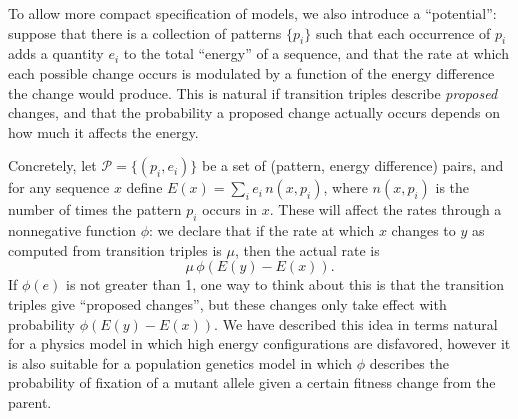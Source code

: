 \documentclass{article}
\newcommand{\calP}{\mathcal{P}}  %
\theoremstyle{plain}
\theoremstyle{definition}
\begin{document}
To allow more compact specification of models,
we also introduce a ``potential'':
suppose that there is a collection of patterns $\{p_i\}$
such that each occurrence of $p_i$ adds a quantity $e_i$ to the total ``energy'' of a sequence,
and that the rate at which each possible change occurs is modulated by a function of the energy difference the change would produce.
This is natural if transition triples describe \emph{proposed} changes,
and that the probability a proposed change actually occurs depends on how much it affects the energy.

Concretely, let $\calP = \{(p_i, e_i)\}$ be a set of (pattern, energy difference) pairs,
and for any sequence $x$ define
$E(x) = \sum_i e_i\, n(x,p_i)$,
where $n(x,p_i)$ is the number of times the pattern $p_i$ occurs in $x$.
These will affect the rates through a nonnegative function $\phi$:
we declare that if the rate at which $x$ changes to $y$ as computed
from transition triples is $\mu$,
then the actual rate is
\[
    \mu \, \phi\left(E(y) - E(x)\right) .
\]
If $\phi(e)$ is not greater than 1, one way to think about this is that
the transition triples give ``proposed changes'',
but these changes only take effect with probability $\phi(E(y) - E(x))$.
We have described this idea in terms natural for a physics model
in which high energy configurations are disfavored,
however it is also suitable for a population genetics model
in which $\phi$ describes the probability of fixation of a mutant allele
given a certain fitness change from the parent.
\end{document}
